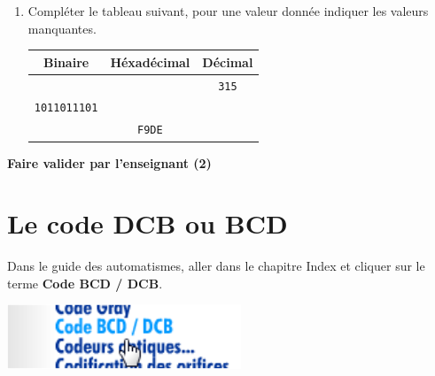\documentclass{article}
\begin{document}
\begin{enumerate}
	\item Compléter le tableau suivant, pour une valeur donnée indiquer les valeurs manquantes.
\begin{center}
	\begin{Form}
		\begin{tabular}{|c|c|c|}
			\hline
			Binaire & Héxadécimal & Décimal \\
			\hline
			\hline
			\TextField[name=r15b0,width=8em]{} & \TextField[name=r15h0,width=4em]{} & \texttt{315}\\
			\hline
			\texttt{1011011101} & \TextField[name=r15h1,width=4em]{} & \TextField[name=r15d1,width=4em]{}\\
			\hline
			\TextField[name=r15b2,width=8em]{} & \texttt{F9DE} & \TextField[name=r15d2,width=4em]{}\\
			\hline
		\end{tabular}
	\end{Form}
\end{center}
\end{enumerate}

\begin{center}
	\vspace{2em}
	\Large
	\textbf{Faire valider par l'enseignant (2)}
\end{center}
\newpage
\section{Le code DCB ou BCD}
Dans le guide des automatismes, aller dans le chapitre \og{}Index\fg{} et cliquer sur le terme \textbf{Code BCD / DCB}.

\begin{center}
	\includegraphics[width=.3\linewidth]{./figures/gda3.png}
\end{center}
\end{document}

